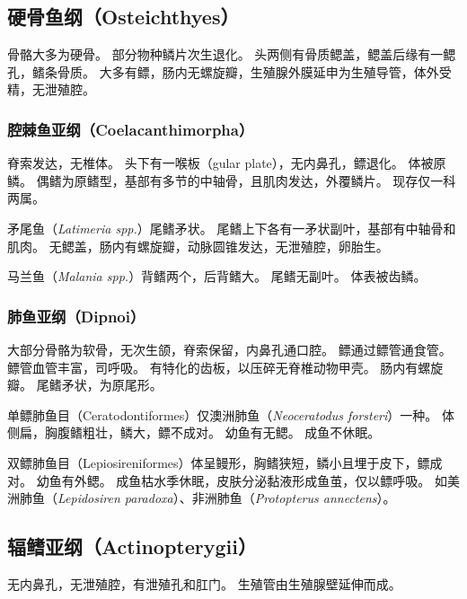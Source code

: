 \documentclass[11pt]{article}
\begin{document}
\subsection{硬骨鱼纲（Osteichthyes）}
骨骼大多为硬骨。
部分物种鳞片次生退化。
头两侧有骨质鳃盖，鳃盖后缘有一鳃孔，鳍条骨质。
大多有鳔，肠内无螺旋瓣，生殖腺外膜延申为生殖导管，体外受精，无泄殖腔。

\subsubsection{腔棘鱼亚纲（Coelacanthimorpha）}
脊索发达，无椎体。
头下有一喉板（gular plate），无内鼻孔，鳔退化。
体被原鳞。
偶鳍为原鳍型，基部有多节的中轴骨，且肌肉发达，外覆鳞片。
现存仅一科两属。

\newline

矛尾鱼（\textit{Latimeria spp.}）尾鳍矛状。
尾鳍上下各有一矛状副叶，基部有中轴骨和肌肉。
无鳃盖，肠内有螺旋瓣，动脉圆锥发达，无泄殖腔，卵胎生。

\newline

马兰鱼（\textit{Malania spp.}）背鳍两个，后背鳍大。
尾鳍无副叶。
体表被齿鳞。

\subsubsection{肺鱼亚纲（Dipnoi）}
大部分骨骼为软骨，无次生颌，脊索保留，内鼻孔通口腔。
鳔通过鳔管通食管。
鳔管血管丰富，司呼吸。
有特化的齿板，以压碎无脊椎动物甲壳。
肠内有螺旋瓣。
尾鳍矛状，为原尾形。

\newline

单鳔肺鱼目（Ceratodontiformes）仅澳洲肺鱼（\textit{Neoceratodus forsteri}）一种。
体侧扁，胸腹鳍粗壮，鳞大，鳔不成对。
幼鱼有无鳃。
成鱼不休眠。

\newline

双鳔肺鱼目（Lepiosireniformes）体呈鳗形，胸鳍狭短，鳞小且埋于皮下，鳔成对。
幼鱼有外鳃。
成鱼枯水季休眠，皮肤分泌黏液形成鱼茧，仅以鳔呼吸。
如美洲肺鱼（\textit{Lepidosiren paradoxa}）、非洲肺鱼（\textit{Protopterus annectens}）。

\subsection{辐鳍亚纲（Actinopterygii）}
无内鼻孔，无泄殖腔，有泄殖孔和肛门。
生殖管由生殖腺壁延伸而成。
\end{document}
